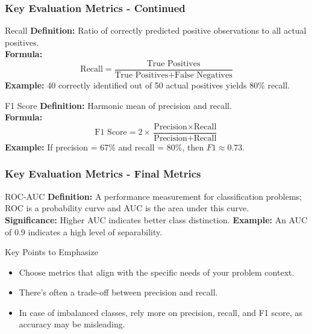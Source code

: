 \documentclass[aspectratio=169]{beamer}
\begin{document}
\begin{frame}[fragile]
    \frametitle{Key Evaluation Metrics - Continued}

    \begin{block}{Recall}
        \textbf{Definition:} Ratio of correctly predicted positive observations to all actual positives.\\
        \textbf{Formula:}
        \begin{equation}
        \text{Recall} = \frac{\text{True Positives}}{\text{True Positives} + \text{False Negatives}}
        \end{equation}
        \textbf{Example:} 40 correctly identified out of 50 actual positives yields 80\% recall.
    \end{block}
    
    \begin{block}{F1 Score}
        \textbf{Definition:} Harmonic mean of precision and recall.\\
        \textbf{Formula:}
        \begin{equation}
        \text{F1 Score} = 2 \times \frac{\text{Precision} \times \text{Recall}}{\text{Precision} + \text{Recall}}
        \end{equation}
        \textbf{Example:} If precision = 67\% and recall = 80\%, then \(F1 \approx 0.73\).
    \end{block}
\end{frame}

\begin{frame}[fragile]
    \frametitle{Key Evaluation Metrics - Final Metrics}

    \begin{block}{ROC-AUC}
        \textbf{Definition:} A performance measurement for classification problems; ROC is a probability curve and AUC is the area under this curve.\\
        \textbf{Significance:} Higher AUC indicates better class distinction.
        \textbf{Example:} An AUC of 0.9 indicates a high level of separability.
    \end{block}

    \begin{block}{Key Points to Emphasize}
        \begin{itemize}
            \item Choose metrics that align with the specific needs of your problem context.
            \item There's often a trade-off between precision and recall.
            \item In case of imbalanced classes, rely more on precision, recall, and F1 score, as accuracy may be misleading.
        \end{itemize}
    \end{block}
\end{frame}
\end{document}

